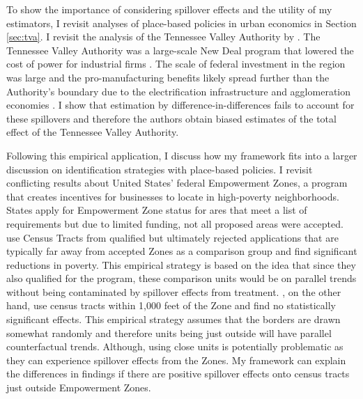 \documentclass[11pt]{article}
\begin{document}
To show the importance of considering spillover effects and the utility of my estimators, I revisit analyses of place-based policies in urban economics in Section \ref{sec:tva}. I revisit the analysis of the Tennessee Valley Authority by \citet{Kline_Moretti_2014}. The Tennessee Valley Authority was a large-scale New Deal program that lowered the cost of power for industrial firms \citep{Kitchens_2014}. The scale of federal investment in the region was large and the pro-manufacturing benefits likely spread further than the Authority's boundary due to the electrification infrastructure and agglomeration economies \citep{Severnini_2014}. I show that estimation by difference-in-differences fails to account for these spillovers and therefore the authors obtain biased estimates of the total effect of the Tennessee Valley Authority.

Following this empirical application, I discuss how my framework fits into a larger discussion on identification strategies with place-based policies. I revisit conflicting results about United States' federal Empowerment Zones, a program that creates incentives for businesses to locate in high-poverty neighborhoods. States apply for Empowerment Zone status for ares that meet a list of requirements but due to limited funding, not all proposed areas were accepted. \citet{Busso_Gregory_Kline_2013} use Census Tracts from qualified but ultimately rejected applications that are typically far away from accepted Zones as a comparison group and find significant reductions in poverty. This empirical strategy is based on the idea that since they also qualified for the program, these comparison units would be on parallel trends without being contaminated by spillover effects from treatment. \citet{Neumark_Kolko_2010}, on the other hand, use census tracts within 1,000 feet of the Zone and find no statistically significant effects. This empirical strategy assumes that the borders are drawn somewhat randomly and therefore units being just outside will have parallel counterfactual trends. Although, using close units is potentially problematic as they can experience spillover effects from the Zones. My framework can explain the differences in findings if there are positive spillover effects onto census tracts just outside Empowerment Zones. 
\end{document}
